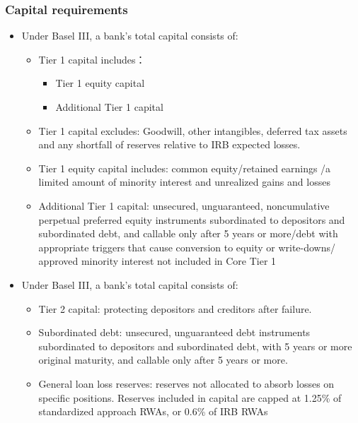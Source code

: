 \subsubsection{Capital requirements}
\begin{itemize}
\item Under Basel III, a bank's total capital consists of:
    \begin{itemize}
    \item Tier 1 capital includes：
        \begin{itemize}
        \item Tier 1 equity capital
        \item Additional Tier 1 capital
        \end{itemize}
    \item Tier 1 capital excludes: Goodwill, other intangibles, deferred tax assets and any shortfall of reserves relative to IRB expected losses.
    \item Tier 1 equity capital includes: common equity/retained earnings /a limited amount of minority interest and unrealized gains and losses
    \item Additional Tier 1 capital: unsecured, unguaranteed, noncumulative perpetual preferred equity instruments subordinated to depositors and subordinated debt, and callable only after 5 years or more/debt with appropriate triggers that cause conversion to equity or write-downs/ approved minority interest not included in Core Tier 1
    \end{itemize}
\item Under Basel III, a bank's total capital consists of:
    \begin{itemize}
    \item Tier 2 capital: protecting depositors and creditors after failure.
    \item Subordinated debt: unsecured, unguaranteed debt instruments subordinated to depositors and subordinated debt, with 5 years or more original maturity, and callable only after 5 years or more.
    \item General loan loss reserves: reserves not allocated to absorb losses on specific positions. Reserves included in capital are capped at 1.25\% of standardized approach RWAs, or 0.6\% of IRB RWAs
    \end{itemize}


\end{itemize}

